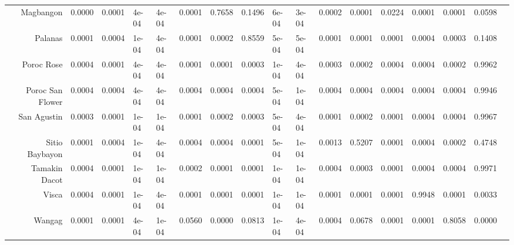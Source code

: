 \documentclass[11pt]{article}
\begin{document}
\begin{tabular}{r|llllllllllllllll}
	 Magbangon         & 0.0000            & 0.0001            & 4e-04             & 4e-04             & 0.0001            & 0.7658            & 0.1496            & 6e-04             & 3e-04             & 0.0002            & 0.0001            & 0.0224            & 0.0001            & 0.0001            & 0.0598           \\
	 Palanas           & 0.0001            & 0.0004            & 1e-04             & 4e-04             & 0.0001            & 0.0002            & 0.8559            & 5e-04             & 5e-04             & 0.0001            & 0.0001            & 0.0001            & 0.0004            & 0.0003            & 0.1408           \\
	 Poroc Rose        & 0.0004            & 0.0001            & 4e-04             & 4e-04             & 0.0001            & 0.0001            & 0.0003            & 1e-04             & 4e-04             & 0.0003            & 0.0002            & 0.0004            & 0.0004            & 0.0002            & 0.9962           \\
	 Poroc San Flower  & 0.0004            & 0.0004            & 4e-04             & 4e-04             & 0.0004            & 0.0004            & 0.0004            & 5e-04             & 1e-04             & 0.0004            & 0.0004            & 0.0004            & 0.0004            & 0.0004            & 0.9946           \\
	 San Agustin       & 0.0003            & 0.0001            & 1e-04             & 1e-04             & 0.0001            & 0.0002            & 0.0003            & 5e-04             & 4e-04             & 0.0001            & 0.0002            & 0.0001            & 0.0004            & 0.0004            & 0.9967           \\
	 Sitio Baybayon    & 0.0001            & 0.0004            & 1e-04             & 4e-04             & 0.0004            & 0.0004            & 0.0001            & 5e-04             & 1e-04             & 0.0013            & 0.5207            & 0.0001            & 0.0004            & 0.0002            & 0.4748           \\
	 Tamakin Dacot     & 0.0004            & 0.0001            & 1e-04             & 1e-04             & 0.0002            & 0.0001            & 0.0001            & 1e-04             & 1e-04             & 0.0004            & 0.0003            & 0.0001            & 0.0004            & 0.0004            & 0.9971           \\
	 Visca             & 0.0004            & 0.0001            & 1e-04             & 4e-04             & 0.0001            & 0.0001            & 0.0001            & 1e-04             & 1e-04             & 0.0001            & 0.0001            & 0.0001            & 0.9948            & 0.0001            & 0.0033           \\
	 Wangag            & 0.0001            & 0.0001            & 4e-04             & 1e-04             & 0.0560            & 0.0000            & 0.0813            & 1e-04             & 4e-04             & 0.0004            & 0.0678            & 0.0001            & 0.0001            & 0.8058            & 0.0000           \\
\end{tabular}
\end{document}
